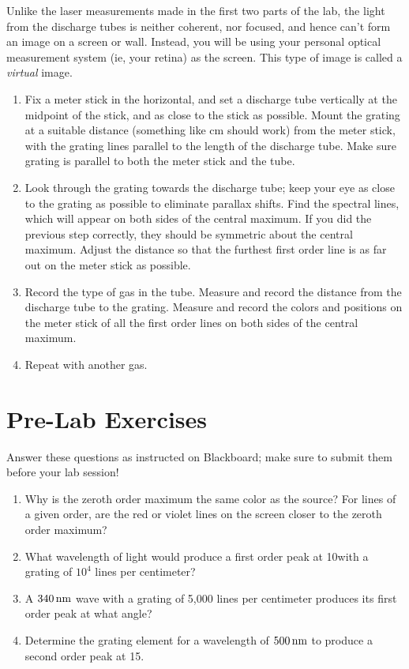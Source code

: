 \documentclass[12pt]{article}
\begin{document}
Unlike the laser measurements made in the first two parts of the lab,
the light from the discharge tubes is neither coherent, nor focused,
and hence can't form an image on a screen or wall.  Instead, you will
be using your personal optical measurement system (ie, your retina) as
the screen.  This type of image is called a \textit{virtual} image.
\begin{enumerate}
\item Fix a meter stick in the horizontal, and set a discharge tube
  vertically at the midpoint of the stick, and as close to the stick
  as possible.  Mount the grating at a suitable distance (something
  like \unit[50]{cm} should work) from the meter stick, with the
  grating lines parallel to the length of the discharge tube.  Make
  sure grating is parallel to both the meter stick and the tube.
\item Look through the grating towards the discharge tube; keep your
  eye as close to the grating as possible to eliminate parallax
  shifts.  Find the spectral lines, which will appear on both sides of
  the central maximum.  If you did the previous step correctly, they
  should be symmetric about the central maximum.  Adjust the distance
  so that the furthest first order line is as far out on the meter
  stick as possible.  
\item Record the type of gas in the tube.  Measure and record the
  distance from the discharge tube to the grating.  Measure and record
  the colors and positions on the meter stick of all the first order
  lines on both sides of the central maximum.
\item Repeat with another gas.
\end{enumerate}

\newpage
 
\section*{Pre-Lab Exercises}

Answer these questions as instructed on Blackboard; make sure to
submit them before your lab session!

\begin{enumerate}
\item Why is the zeroth order maximum the same color as the source?
  For lines of a given order, are the red or violet lines on the
  screen closer to the zeroth order maximum?
\item What wavelength of light would produce a first order peak at
  10\textdegree with a grating of $10^4$ lines per centimeter?
\item A $\unit[340]{n m}$ wave with a grating of 5,000 lines per
  centimeter produces its first order peak at what angle?
\item Determine the grating element for a wavelength of
  $\unit[500]{n m}$ to produce a second order peak at 15\textdegree.
\end{enumerate}
\end{document}
